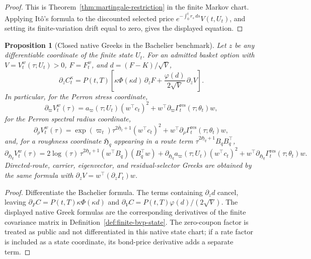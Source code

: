 \documentclass[11pt,a4paper]{amsart}
\theoremstyle{plain}
\newtheorem{proposition}[theorem]{Proposition}
\theoremstyle{definition}
\theoremstyle{remark}
\newcommand{\dd}{\,d}
\begin{document}
\begin{proof}
This is Theorem~\ref{thm:martingale-restriction} in the finite Markov chart.  Applying It\^o's
formula to the discounted selected price \(e^{-\int_0^t r_s\dd s}V(t,U_t)\), and setting its
finite-variation drift equal to zero, gives the displayed equation.
\end{proof}

\begin{proposition}[Closed native Greeks in the Bachelier benchmark]\label{prop:closed-native-greeks}
Let \(z\) be any differentiable coordinate of the finite state \(U_t\).  For an admitted basket
option with \(V=V_t^w(\tau;U_t)>0\), \(F=F_t^w\), and \(d=(F-K)/\sqrt V\),
\[
        \partial_z C_t^\kappa
        =
        P(t,T)
        \left[
        \kappa\Phi(\kappa d)\,\partial_zF
        +
        \frac{\varphi(d)}{2\sqrt V}\,\partial_zV
        \right].
\]
In particular, for the Perron stress coordinate,
\[
        \partial_{\varpi}V_t^w(\tau)
        =
        a_\varpi(\tau;U_t)(w^\top c_t)^2
        +
        w^\top\partial_\varpi\Gamma_t^{\mathrm{res}}(\tau;\theta_t)w ,
\]
for the Perron spectral radius coordinate,
\[
        \partial_{\rho}V_t^w(\tau)
        =
        \exp(\varpi_t)\tau^{2\bar{\mathfrak{H}}_t+1}(w^\top c_t)^2
        +
        w^\top\partial_\rho\Gamma_t^{\mathrm{res}}(\tau;\theta_t)w ,
\]
and, for a roughness coordinate \(\mathfrak{H}_q\) appearing in a route term
\(\tau^{2\mathfrak{H}_q+1}B_qB_q^\top\),
\[
        \partial_{\mathfrak{H}_q}V_t^w(\tau)
        =
        2\log(\tau)\,
        \tau^{2\mathfrak{H}_q+1}(w^\top B_q)(B_q^\top w)
        +
        \partial_{\mathfrak{H}_q}a_\varpi(\tau;U_t)(w^\top c_t)^2
        +
        w^\top\partial_{\mathfrak{H}_q}\Gamma_t^{\mathrm{res}}(\tau;\theta_t)w .
\]
Directed-route, carrier, eigenvector, and residual-selector Greeks are obtained by the same
formula with \(\partial_zV=w^\top(\partial_z\Gamma_t)w\).
\end{proposition}

\begin{proof}
Differentiate the Bachelier formula.  The terms containing \(\partial_z d\) cancel, leaving
\(\partial_F C=P(t,T)\kappa\Phi(\kappa d)\) and
\(\partial_V C=P(t,T)\varphi(d)/(2\sqrt V)\).  The displayed native Greek formulas are the
corresponding derivatives of the finite covariance matrix in
Definition~\ref{def:finite-bvp-state}.  The zero-coupon factor is treated as public and not
differentiated in this native state chart; if a rate factor is included as a state coordinate, its
bond-price derivative adds a separate term.
\end{proof}
\end{document}

